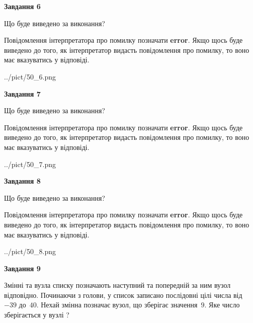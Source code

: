 \documentclass[12pt, ukrainian]{article}
\begin{document}
{\begin {large}
{\begin {center}\textbf{Завдання 6}\end {center}}\par
Що буде виведено за виконання?

Повідомлення інтерпретатора про помилку позначати \textbf{error}.
Якщо щось буде виведено до того, як інтерпретатор видасть повідомлення про помилку, 
то воно має вказуватись у відповіді. \par


\begin{center}
	{../pict/50_6.png}
\end{center}
\newpage

{\begin {center}\textbf{Завдання 7}\end {center}}\par
Що буде виведено за виконання?

Повідомлення інтерпретатора про помилку позначати \textbf{error}.
Якщо щось буде виведено до того, як інтерпретатор видасть повідомлення про помилку, 
то воно має вказуватись у відповіді. \par


\begin{center}
	{../pict/50_7.png}
\end{center}
\newpage

{\begin {center}\textbf{Завдання 8}\end {center}}\par
Що буде виведено за виконання?

Повідомлення інтерпретатора про помилку позначати \textbf{error}.
Якщо щось буде виведено до того, як інтерпретатор видасть повідомлення про помилку, 
то воно має вказуватись у відповіді. \par


\begin{center}
	{../pict/50_8.png}
\end{center}
\newpage

{\begin {center}\textbf{Завдання 9}\end {center}}\par
Змінні  та  вузла списку позначають наступний та попередній за ним вузол відповідно. Починаючи з голови, у список записано послідовні цілі числа від~$-39$ до~$40$. Нехай змінна  позначає вузол, що зберігає значення~$9$.
Яке число зберігається у вузлі  ?\par
\newpage


\end{large}}
\end{document}
